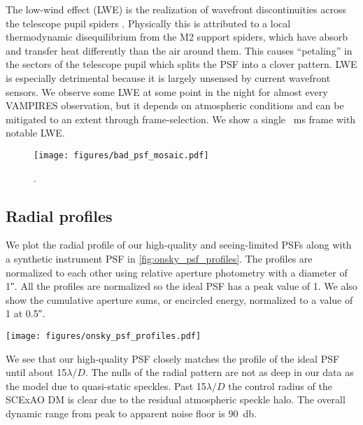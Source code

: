 The low-wind effect (LWE) is the realization of wavefront discontinuities across the telescope pupil spiders  \citep{cantalloube_origin_2018}. Physically this is attributed to a local thermodynamic disequilibrium from the M2 support spiders, which have absorb and transfer heat differently than the air around them. This causes ``petaling'' in the sectors of the telescope pupil which splits the PSF into a clover pattern. LWE is especially detrimental because it is largely unsensed by current wavefront sensors. We observe some LWE at some point in the night for almost every VAMPIRES observation, but it depends on atmospheric conditions and can be mitigated to an extent through frame-selection. We show a single \SI{}{\milli\second} frame with notable LWE.


\begin{figure}
    \centering
    \texttt{[image: figures/bad\_psf\_mosaic.pdf]}
    \caption{.\label{fig:bad_psfs}}
\end{figure}

\subsection{Radial profiles}
We plot the radial profile of our high-quality and seeing-limited PSFs along with a synthetic instrument PSF in \autoref{fig:onsky_psf_profiles}. The profiles are normalized to each other using relative aperture photometry with a  diameter of \ang{;;1}. All the profiles are normalized so the ideal PSF has a peak value of 1. We also show the cumulative aperture sums, or encircled energy, normalized to a value of 1 at \ang{;;0.5}.
\begin{figure*}
    \centering
    \texttt{[image: figures/onsky\_psf\_profiles.pdf]}
    \caption{\label{fig:onsky_psf_profiles}}
\end{figure*}

We see that our high-quality PSF closely matches the profile of the ideal PSF until about 15$\lambda/D$. The nulls of the radial pattern are not as deep in our data as the model due to quasi-static speckles. Past 15$\lambda/D$ the control radius of the SCExAO DM is clear due to the residual atmospheric speckle halo. The overall dynamic range from peak to apparent noise floor is \SI{90}{\decibel}.